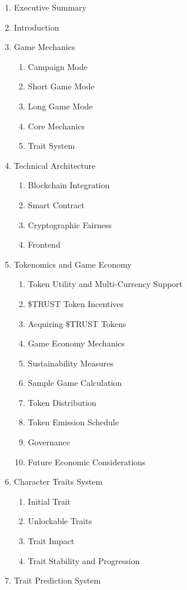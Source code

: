 \documentclass[]{article}
\begin{document}
\begin{enumerate}
\def\labelenumi{\arabic{enumi}.}
\tightlist
\item Executive Summary
\item Introduction
\item Game Mechanics
   \begin{enumerate}
   \item Campaign Mode
   \item Short Game Mode
   \item Long Game Mode
   \item Core Mechanics
   \item Trait System
   \end{enumerate}
\item Technical Architecture
   \begin{enumerate}
   \item Blockchain Integration
   \item Smart Contract
   \item Cryptographic Fairness
   \item Frontend
   \end{enumerate}
\item Tokenomics and Game Economy
   \begin{enumerate}
   \item Token Utility and Multi-Currency Support
   \item \$TRUST Token Incentives
   \item Acquiring \$TRUST Tokens
   \item Game Economy Mechanics
   \item Sustainability Measures
   \item Sample Game Calculation
   \item Token Distribution
   \item Token Emission Schedule
   \item Governance
   \item Future Economic Considerations
   \end{enumerate}
\item Character Traits System
   \begin{enumerate}
   \item Initial Trait
   \item Unlockable Traits
   \item Trait Impact
   \item Trait Stability and Progression
   \end{enumerate}
\item Trait Prediction System

\end{enumerate}
\end{document}
